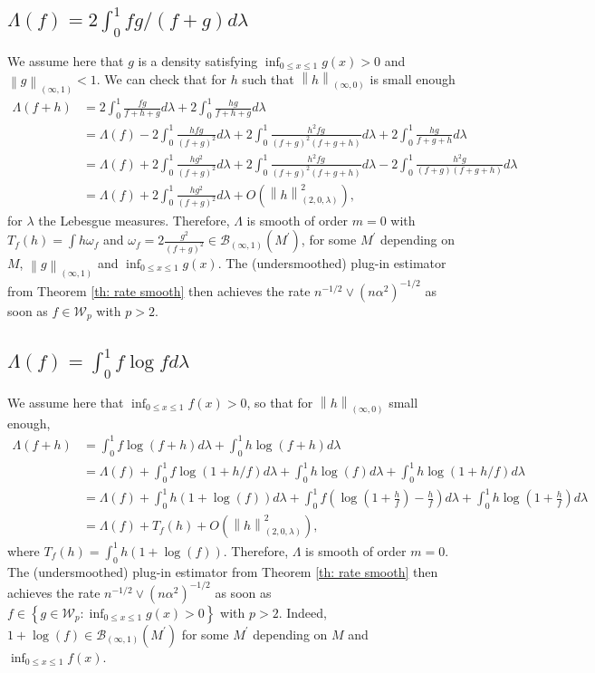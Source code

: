 \documentclass[preprint]{imsart}
\newcommand\norm[1]{\left\lVert#1\right\rVert}
\numberwithin{equation}{section}
\begin{document}
\subsection{$\Lambda(f)=2\int_0^1fg/(f+g)d\lambda$}
We assume here that $g$ is a density satisfying $\inf_{0\leq x\leq 1} g(x)>0$ and $\norm{g}_{(\infty,1)}<1$. We can check that for $h$ such that $\norm{h}_{(\infty, 0)}$ is small enough
\begin{align*}
\Lambda(f+h) &=2\int_0^1\frac{fg}{f+h+g}d\lambda + 2\int_0^1\frac{hg}{f+h+g}d\lambda\\
&= \Lambda(f) - 2\int_0^1\frac{hfg}{(f+g)^2}d\lambda + 2\int_0^1\frac{h^2fg}{(f+g)^2(f+g+h)} d\lambda+ 2\int_0^1\frac{hg}{f+g+h}d\lambda\\
&= \Lambda(f) + 2\int_0^1\frac{hg^2}{(f+g)^2}d\lambda + 2\int_0^1\frac{h^2fg}{(f+g)^2(f+g+h)}d\lambda - 2\int_0^1\frac{h^2g}{(f+g)(f+g+h)}d\lambda\\
&= \Lambda(f) + 2\int_0^1\frac{hg^2}{(f+g)^2}d\lambda +O\left(\norm{h}^2_{(2,0,\lambda)}\right),
\end{align*}
for $\lambda$ the Lebesgue measures. Therefore, $\Lambda$ is smooth of order $m=0$ with $T_f(h)=\int h\omega_f$ and $\omega_f=2 \frac{g^2}{(f+g)^2}\in\mathcal{B}_{(\infty,1)}(M^\prime)$, for some $M^\prime$ depending on $M$, $\norm{g}_{(\infty,1)}$ and $\inf_{0\leq x\leq 1} g(x)$. The (undersmoothed) plug-in estimator from Theorem \ref{th: rate smooth} then achieves the rate $n^{-1/2}\vee(n\alpha^2)^{-1/2}$ as soon as $f\in\mathcal{W}_{p}$ with $p> 2$.


\subsection{$\Lambda(f)=\int_0^1f\log fd\lambda$}

We assume here that $\inf_{0\leq x\leq 1} f(x)>0$, so that for $\norm{h}_{(\infty, 0)}$ small enough,
\begin{align*}
\Lambda(f+h) &=\int_0^1f\log(f+h)d\lambda + \int_0^1h\log(f+h)d\lambda\\
&= \Lambda(f) + \int_0^1f\log(1+h/f)d\lambda + \int_0^1h\log(f)d\lambda + \int_0^1h\log(1+h/f)d\lambda\\
&= \Lambda(f) + \int_0^1h\left(1+\log(f)\right)d\lambda + \int_0^1f\left(\log\left(1+\frac{h}{f}\right)-\frac{h}{f}\right)d\lambda  + \int_0^1h\log\left(1+\frac{h}{f}\right)d\lambda\\
&=\Lambda(f) + T_f(h) + O\left(\norm{h}^2_{(2,0,\lambda)}\right),
\end{align*}
where $T_f(h) = \int_0^1h\left(1+\log(f)\right)$. Therefore, $\Lambda$ is smooth of order $m=0$. The (undersmoothed) plug-in estimator from Theorem \ref{th: rate smooth} then achieves the rate $n^{-1/2}\vee(n\alpha^2)^{-1/2}$ as soon as $f\in\left\{g\in\mathcal{W}_{p}\colon \inf_{0\leq x\leq 1} g(x)>0 \right\}$ with $p> 2$. Indeed, $1+\log(f) \in\mathcal{B}_{(\infty,1)}(M^\prime)$ for some $M^\prime$ depending on $M$ and $\inf_{0\leq x\leq 1} f(x)$.
\end{document}

